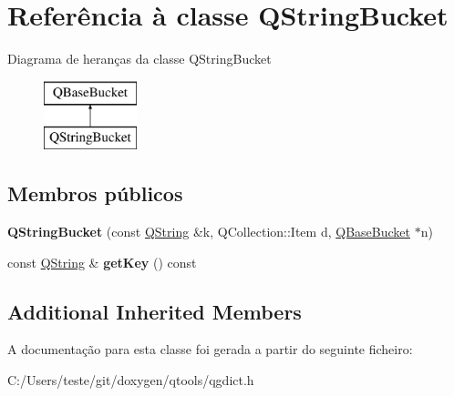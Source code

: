 \hypertarget{class_q_string_bucket}{\section{Referência à classe Q\-String\-Bucket}
\label{class_q_string_bucket}
}
Diagrama de heranças da classe Q\-String\-Bucket\begin{figure}[H]
\begin{center}
\leavevmode
\includegraphics[height=2.000000cm]{class_q_string_bucket}
\end{center}
\end{figure}
\subsection*{Membros públicos}
\begin{DoxyCompactItemize}
\item 
\hypertarget{class_q_string_bucket_ac62442ea8b10db01a2df885fd63a52fd}{{\bfseries Q\-String\-Bucket} (const \hyperlink{class_q_string}{Q\-String} \&k, Q\-Collection\-::\-Item d, \hyperlink{class_q_base_bucket}{Q\-Base\-Bucket} $\ast$n)}\label{class_q_string_bucket_ac62442ea8b10db01a2df885fd63a52fd}

\item 
\hypertarget{class_q_string_bucket_a93e5684e7acad83595e9ed550904a433}{const \hyperlink{class_q_string}{Q\-String} \& {\bfseries get\-Key} () const }\label{class_q_string_bucket_a93e5684e7acad83595e9ed550904a433}

\end{DoxyCompactItemize}
\subsection*{Additional Inherited Members}


A documentação para esta classe foi gerada a partir do seguinte ficheiro\-:\begin{DoxyCompactItemize}
\item 
C\-:/\-Users/teste/git/doxygen/qtools/qgdict.\-h\end{DoxyCompactItemize}
